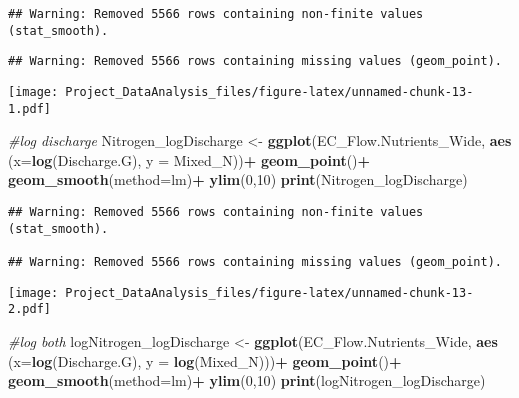 \documentclass[]{article}
\newenvironment{Shaded}{\begin{snugshade}}{\end{snugshade}}
\newcommand{\CommentTok}[1]{\textcolor[rgb]{0.56,0.35,0.01}{\textit{#1}}}
\newcommand{\DataTypeTok}[1]{\textcolor[rgb]{0.13,0.29,0.53}{#1}}
\newcommand{\DecValTok}[1]{\textcolor[rgb]{0.00,0.00,0.81}{#1}}
\newcommand{\KeywordTok}[1]{\textcolor[rgb]{0.13,0.29,0.53}{\textbf{#1}}}
\newcommand{\NormalTok}[1]{#1}
\newcommand{\OperatorTok}[1]{\textcolor[rgb]{0.81,0.36,0.00}{\textbf{#1}}}
\newcommand{\StringTok}[1]{\textcolor[rgb]{0.31,0.60,0.02}{#1}}
\begin{document}
\begin{verbatim}
## Warning: Removed 5566 rows containing non-finite values (stat_smooth).
\end{verbatim}

\begin{verbatim}
## Warning: Removed 5566 rows containing missing values (geom_point).
\end{verbatim}

\texttt{[image: Project\_DataAnalysis\_files/figure-latex/unnamed-chunk-13-1.pdf]}

\begin{Shaded}
\begin{Highlighting}[]
\CommentTok{#log discharge }
\NormalTok{Nitrogen_logDischarge <-}\StringTok{ }
\StringTok{  }\KeywordTok{ggplot}\NormalTok{(EC_Flow.Nutrients_Wide, }\KeywordTok{aes}\NormalTok{ (}\DataTypeTok{x=}\KeywordTok{log}\NormalTok{(Discharge.G), }\DataTypeTok{y =}\NormalTok{ Mixed_N))}\OperatorTok{+}
\StringTok{  }\KeywordTok{geom_point}\NormalTok{()}\OperatorTok{+}
\StringTok{  }\KeywordTok{geom_smooth}\NormalTok{(}\DataTypeTok{method=}\NormalTok{lm)}\OperatorTok{+}
\StringTok{  }\KeywordTok{ylim}\NormalTok{(}\DecValTok{0}\NormalTok{,}\DecValTok{10}\NormalTok{)}
\KeywordTok{print}\NormalTok{(Nitrogen_logDischarge)}
\end{Highlighting}
\end{Shaded}

\begin{verbatim}
## Warning: Removed 5566 rows containing non-finite values (stat_smooth).

## Warning: Removed 5566 rows containing missing values (geom_point).
\end{verbatim}

\texttt{[image: Project\_DataAnalysis\_files/figure-latex/unnamed-chunk-13-2.pdf]}

\begin{Shaded}
\begin{Highlighting}[]
\CommentTok{#log both }
\NormalTok{logNitrogen_logDischarge <-}\StringTok{ }
\StringTok{  }\KeywordTok{ggplot}\NormalTok{(EC_Flow.Nutrients_Wide, }\KeywordTok{aes}\NormalTok{ (}\DataTypeTok{x=}\KeywordTok{log}\NormalTok{(Discharge.G), }\DataTypeTok{y =} \KeywordTok{log}\NormalTok{(Mixed_N)))}\OperatorTok{+}
\StringTok{  }\KeywordTok{geom_point}\NormalTok{()}\OperatorTok{+}
\StringTok{  }\KeywordTok{geom_smooth}\NormalTok{(}\DataTypeTok{method=}\NormalTok{lm)}\OperatorTok{+}
\StringTok{  }\KeywordTok{ylim}\NormalTok{(}\DecValTok{0}\NormalTok{,}\DecValTok{10}\NormalTok{)}
\KeywordTok{print}\NormalTok{(logNitrogen_logDischarge)}
\end{Highlighting}
\end{Shaded}
\end{document}

